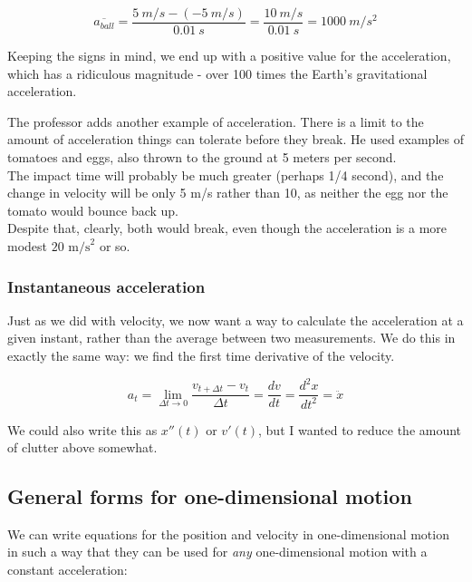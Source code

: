 \begin{equation}
 \overbar{a_{ball}} = \frac{\SI{5}{m/s} - (\SI{-5}{m/s})}{\SI{0.01}{s}} = \frac{\SI{10}{m/s}}{\SI{0.01}{s}} = \SI{1000}{m/s^2}
\end{equation}

Keeping the signs in mind, we end up with a positive value for the acceleration, which has a ridiculous magnitude - over 100 times the Earth's gravitational acceleration.

The professor adds another example of acceleration. There is a limit to the amount of acceleration things can tolerate before they break. He used examples of tomatoes and eggs, also thrown to the ground at 5 meters per second.\\
The impact time will probably be much greater (perhaps 1/4 second), and the change in velocity will be only 5 m/s rather than 10, as neither the egg nor the tomato would bounce back up.\\
Despite that, clearly, both would break, even though the acceleration is a more modest $20 \text{ m/s}^2$ or so.


\subsubsection{Instantaneous acceleration}

Just as we did with velocity, we now want a way to calculate the acceleration at a given instant, rather than the average between two measurements. We do this in exactly the same way: we find the first time derivative of the velocity.

\begingroup
\large
\begin{equation}
 a_t = \lim_{\Delta t \to 0} \frac{v_{t + \Delta t} - v_t}{\Delta t} = \frac{dv}{dt} = \frac{d^2x}{dt^2} = \ddot{x}
\end{equation}
\endgroup

We could also write this as $x''(t)$ or $v'(t)$, but I wanted to reduce the amount of clutter above somewhat.\\


\subsection{General forms for one-dimensional motion}

We can write equations for the position and velocity in one-dimensional motion in such a way that they can be used for \emph{any} one-dimensional motion with a constant acceleration:

